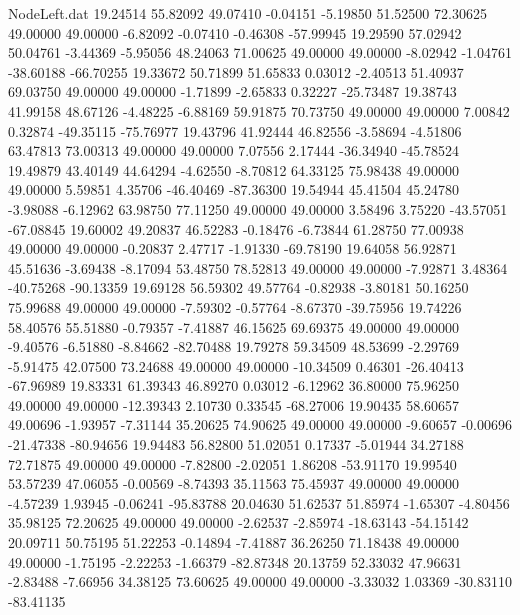 \begin{filecontents}{NodeLeft.dat}
  19.24514   55.82092   49.07410    -0.04151   -5.19850   51.52500   72.30625   49.00000   49.00000   -6.82092   -0.07410   -0.46308  -57.99945
  19.29590   57.02942   50.04761    -3.44369   -5.95056   48.24063   71.00625   49.00000   49.00000   -8.02942   -1.04761  -38.60188  -66.70255
  19.33672   50.71899   51.65833     0.03012   -2.40513   51.40937   69.03750   49.00000   49.00000   -1.71899   -2.65833    0.32227  -25.73487
  19.38743   41.99158   48.67126    -4.48225   -6.88169   59.91875   70.73750   49.00000   49.00000    7.00842    0.32874  -49.35115  -75.76977
  19.43796   41.92444   46.82556    -3.58694   -4.51806   63.47813   73.00313   49.00000   49.00000    7.07556    2.17444  -36.34940  -45.78524
  19.49879   43.40149   44.64294    -4.62550   -8.70812   64.33125   75.98438   49.00000   49.00000    5.59851    4.35706  -46.40469  -87.36300
  19.54944   45.41504   45.24780    -3.98088   -6.12962   63.98750   77.11250   49.00000   49.00000    3.58496    3.75220  -43.57051  -67.08845
  19.60002   49.20837   46.52283    -0.18476   -6.73844   61.28750   77.00938   49.00000   49.00000   -0.20837    2.47717   -1.91330  -69.78190
  19.64058   56.92871   45.51636    -3.69438   -8.17094   53.48750   78.52813   49.00000   49.00000   -7.92871    3.48364  -40.75268  -90.13359
  19.69128   56.59302   49.57764    -0.82938   -3.80181   50.16250   75.99688   49.00000   49.00000   -7.59302   -0.57764   -8.67370  -39.75956
  19.74226   58.40576   55.51880    -0.79357   -7.41887   46.15625   69.69375   49.00000   49.00000   -9.40576   -6.51880   -8.84662  -82.70488
  19.79278   59.34509   48.53699    -2.29769   -5.91475   42.07500   73.24688   49.00000   49.00000  -10.34509    0.46301  -26.40413  -67.96989
  19.83331   61.39343   46.89270     0.03012   -6.12962   36.80000   75.96250   49.00000   49.00000  -12.39343    2.10730    0.33545  -68.27006
  19.90435   58.60657   49.00696    -1.93957   -7.31144   35.20625   74.90625   49.00000   49.00000   -9.60657   -0.00696  -21.47338  -80.94656
  19.94483   56.82800   51.02051     0.17337   -5.01944   34.27188   72.71875   49.00000   49.00000   -7.82800   -2.02051    1.86208  -53.91170
  19.99540   53.57239   47.06055    -0.00569   -8.74393   35.11563   75.45937   49.00000   49.00000   -4.57239    1.93945   -0.06241  -95.83788
  20.04630   51.62537   51.85974    -1.65307   -4.80456   35.98125   72.20625   49.00000   49.00000   -2.62537   -2.85974  -18.63143  -54.15142
  20.09711   50.75195   51.22253    -0.14894   -7.41887   36.26250   71.18438   49.00000   49.00000   -1.75195   -2.22253   -1.66379  -82.87348
  20.13759   52.33032   47.96631    -2.83488   -7.66956   34.38125   73.60625   49.00000   49.00000   -3.33032    1.03369  -30.83110  -83.41135

\end{filecontents}
